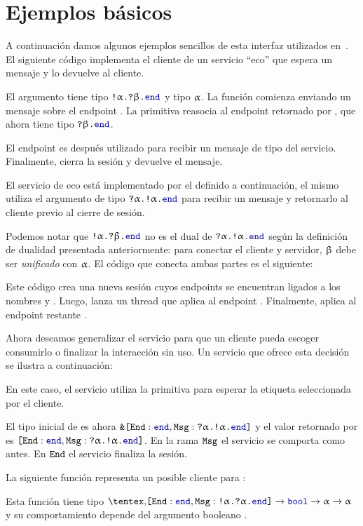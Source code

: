 \section{Ejemplos básicos}

A continuación damos algunos ejemplos sencillos de esta interfaz utilizados
en~\cite{DBLP:journals/jfp/Padovani17}. El siguiente código implementa el
cliente de un servicio ``eco'' que espera un mensaje y lo devuelve al cliente.

\SimpleEchoClient

El argumento  tiene tipo $\Out\tvarA\In\tvarB\End$ y  tipo
$\tvarA$. La función  comienza enviando un mensaje  sobre
el endpoint . La primitiva  reasocia  al endpoint
retornado por , que ahora tiene tipo $\In\tvarB\End$.

El endpoint es después utilizado para recibir un mensaje de tipo  del
servicio. Finalmente,  cierra la sesión y devuelve el mensaje.

El servicio de eco está implementado por el  definido a
continuación, el mismo utiliza el argumento  de tipo
$\In\tvarA\Out\tvarA\End$ para recibir un mensaje  y retornarlo al
cliente previo al cierre de sesión.

\SimpleEchoService

Podemos notar que $\Out\tvarA\In\tvarB\End$ no es el dual de
$\In\tvar\Out\tvar\End$ según la definición de dualidad presentada
anteriormente: para conectar el cliente y servidor, $\tvarB$ debe ser
\emph{unificado} con $\tvarA$. El código que conecta ambas partes es el
siguiente:

\SimpleEchoMain

Este código crea una nueva sesión cuyos endpoints se encuentran ligados a los
nombres  y . Luego, lanza un thread que aplica  al
endpoint . Finalmente, aplica  al endpoint restante
.

Ahora deseamos generalizar el servicio para que un cliente pueda escoger
consumirlo o finalizar la interacción sin uso. Un servicio que ofrece esta
decisión se ilustra a continuación:

\OptionalEchoService

En este caso, el servicio utiliza la primitiva  para esperar la
etiqueta seleccionada por el cliente.

El tipo inicial de  es ahora $\Branch\set{\Tag[End] : \End, \Tag[Msg]
:\In\tvarA\Out\tvar\End}$ y el valor retornado por  es
$\set{\Tag[End] : \End, \Tag[Msg] :\In\tvarA\Out\tvar\End}$. En la rama
$\Tag[Msg]$ el servicio se comporta como antes. En $\Tag[End]$ el servicio
finaliza la sesión.

La siguiente función representa un posible cliente para :

\OptionalEchoClient

Esta función tiene tipo $\Choice\set{\Tag[End] : \End, \Tag[Msg] :
\Out\tvar\In\tvar\End} \to \tbool \to \tvar \to \tvar$ y su comportamiento depende del argumento booleano .
